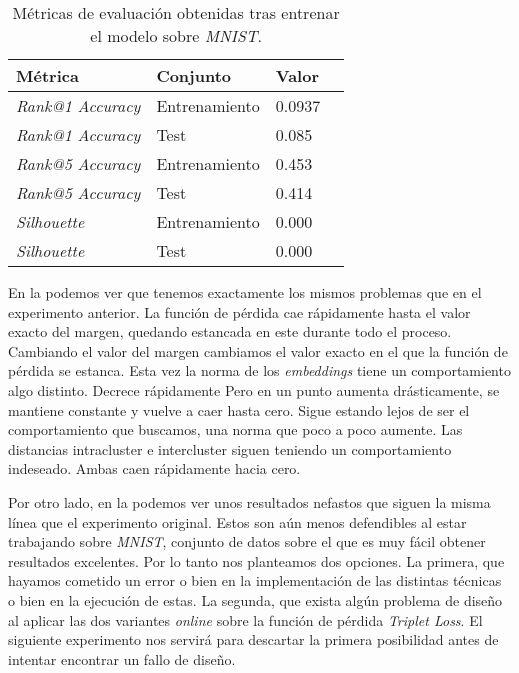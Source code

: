 \begin{table}[H]
\centering
\begin{tabular}{|l|l|l|l|}
    \hline
    Métrica & Conjunto & Valor \\
    \hline

    \textit{Rank@1 Accuracy} & Entrenamiento & 0.0937 \\
    \textit{Rank@1 Accuracy} & Test & 0.085  \\
    \textit{Rank@5 Accuracy} & Entrenamiento & 0.453  \\
    \textit{Rank@5 Accuracy} & Test & 0.414 \\
    \textit{Silhouette} & Entrenamiento & 0.000 \\
    \textit{Silhouette} & Test & 0.000 \\

    \hline

\end{tabular}
\caption{Métricas de evaluación obtenidas tras entrenar el modelo sobre \textit{MNIST}.}
    \label{table:resultados_mnist_mal}
\end{table}

En la  podemos ver que tenemos exactamente los mismos problemas que en el experimento anterior. La función de pérdida cae rápidamente hasta el valor exacto del margen, quedando estancada en este durante todo el proceso. Cambiando el valor del margen cambiamos el valor exacto en el que la función de pérdida se estanca. Esta vez la norma de los \textit{embeddings} tiene un comportamiento algo distinto. Decrece rápidamente Pero en un punto aumenta drásticamente, se mantiene constante y vuelve a caer hasta cero. Sigue estando lejos de ser el comportamiento que buscamos, una norma que poco a poco aumente. Las distancias intracluster e intercluster siguen teniendo un comportamiento indeseado. Ambas caen rápidamente hacia cero.

Por otro lado, en la  podemos ver unos resultados nefastos que siguen la misma línea que el experimento original. Estos son aún menos defendibles al estar trabajando sobre \textit{MNIST}, conjunto de datos sobre el que es muy fácil obtener resultados excelentes. Por lo tanto nos planteamos dos opciones. La primera, que hayamos cometido un error o bien en la implementación de las distintas técnicas o bien en la ejecución de estas. La segunda, que exista algún problema de diseño al aplicar las dos variantes \textit{online} sobre la función de pérdida \textit{Triplet Loss}. El siguiente experimento nos servirá para descartar la primera posibilidad antes de intentar encontrar un fallo de diseño.

